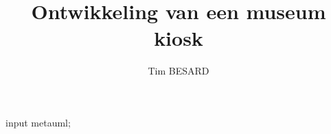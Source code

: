 \documentclass[a4paper,oneside,11pt,final]{memoir}
\title{Ontwikkeling van een museum kiosk}
\author{Tim BESARD}
\begin{document}
\begin{empfile}
\begin{empcmds}
input metauml;
\end{empcmds}









\end{empfile}
\end{document}
